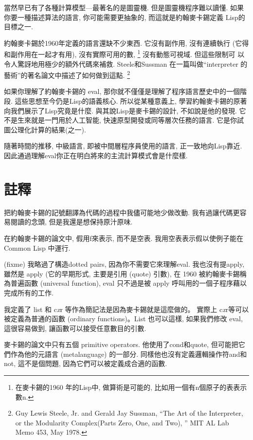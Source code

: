 \documentclass[12pt]{article}
\begin{document}
\begin{CJK}{UTF8}{bsmi}
當然早已有了各種計算模型---最著名的是圖靈機. 
但是圖靈機程序難以讀懂. 
如果你要一種描述算法的語言, 
你可能需要更抽象的, 
而這就是約翰麥卡錫定義 
Lisp的目標之一. 

約翰麥卡錫於1960年定義的語言還缺不少東西. 
它沒有副作用, 
沒有連續執行 
(它得和副作用在一起才有用), 
沒有實際可用的數, \footnote{在麥卡錫的1960 
年的Lisp中, 
做算術是可能的, 
比如用一個有n個原子的表表示數n.} 
沒有動態可視域. 
但這些限制可 
以令人驚訝地用極少的額外代碼來補救. 
Steele和Sussman
在一篇叫做``interpreter 的藝術''的著名論文中描述了如何做到這點.
\footnote{Guy Lewis Steele, Jr.  and Gerald Jay Sussman,
``The Art of the Interpreter, or the Modularity Complex(Parts Zero, One, and Two), '' 
MIT AL Lab Memo 453, May 1978.} 

如果你理解了約翰麥卡錫的 eval, 
那你就不僅僅是理解了程序語言歷史中的一個階段. 
這些思想至今仍是Lisp的語義核心. 
所以從某種意義上, 
學習約翰麥卡錫的原著向我們展示了Lisp究竟是什麼. 
與其說Lisp是麥卡錫的設計, 不如說是他的發現. 
它不是生來就是一門用於人工智能, 
快速原型開發或同等層次任務的語言. 
它是你試圖公理化計算的結果(之一). 

隨著時間的推移, 
中級語言, 
即被中間層程序員使用的語言, 
正一致地向Lisp靠近. 
因此通過理解eval你正在明白將來的主流計算模式會是什麼樣. 

\section{註釋} 
把約翰麥卡錫的記號翻譯為代碼的過程中我儘可能地少做改動. 
我有過讓代碼更容易閱讀的念頭, 
但是我還是想保持原汁原味. 

在約翰麥卡錫的論文中, 假用f來表示, 
而不是空表. 
我用空表表示假以使例子能在
Common Lisp 中運行. 

(fixme) 
我略過了構造dotted 
pairs, 
因為你不需要它來理解eval. 
我也沒有提apply, 
雖然是 apply (它的早期形式, 主要是引用 (quote) 引數), 在 1960 被約翰麥卡錫稱為普遍函數
(universal function), 
eval 只不過是被 apply 呼叫用的一個子程序藉以完成所有的工作. 

我定義了 list 和 c{\it x}r 等作為簡記法是因為麥卡錫就是這麼做的。
實際上 c{\it x}r等可以被定義為普通的函數 (ordinary functions)。List
也可以這樣, 如果我們修改 eval, 
這很容易做到, 讓函數可以接受任意數目的引數.  

麥卡錫的論文中只有五個 primitive operators. 
他使用了cond和quote, 但可能把它們作為他的元語言 (metalanguage) 的一部分. 
同樣他也沒有定義邏輯操作符and和not, 
這不是個問題, 
因為它們可以被定義成合適的函數. 


\end{CJK}
\end{document}
